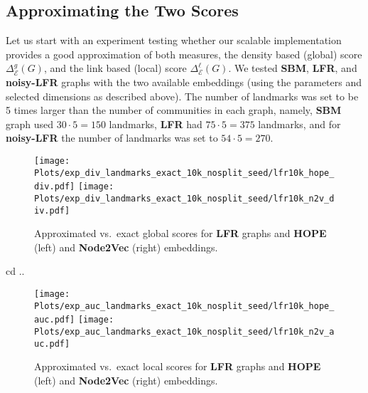 \documentclass[11pt]{article}
\newcommand{\emb}{\mathcal E}
\begin{document}
\subsection{Approximating the Two Scores}\label{sec:landmarks}

Let us start with an experiment testing whether our scalable implementation provides a good approximation of both measures, the 
density based (global) score $\Delta_\emb^g(G)$, and the link based (local) score $\Delta_\emb^{\ell}(G)$. We tested \textbf{SBM}, \textbf{LFR}, and \textbf{noisy-LFR} graphs with the two available embeddings (using the parameters and selected dimensions as described above). The number of landmarks was set to be 5 times larger than the number of communities in each graph, namely, \textbf{SBM} graph used $30\cdot 5 = 150$ landmarks, \textbf{LFR} had $75\cdot 5 = 375$ landmarks, and for \textbf{noisy-LFR} the number of landmarks was set to $54\cdot 5 = 270$. 

 \begin{figure}[htb]
     \centering
     \texttt{[image: Plots/exp\_div\_landmarks\_exact\_10k\_nosplit\_seed/lfr10k\_hope\_div.pdf]}
         \hspace{.1cm}
     \texttt{[image: Plots/exp\_div\_landmarks\_exact\_10k\_nosplit\_seed/lfr10k\_n2v\_div.pdf]}
     \caption{Approximated vs.\ exact global scores for \textbf{LFR} graphs and \textbf{HOPE} (left) and \textbf{Node2Vec} (right) embeddings.}
     \label{fig_paper:10kapprox_exact_div}
 \end{figure}cd ..

 \begin{figure}[htb]
     \centering
     \texttt{[image: Plots/exp\_auc\_landmarks\_exact\_10k\_nosplit\_seed/lfr10k\_hope\_auc.pdf]}
         \hspace{.1cm}
     \texttt{[image: Plots/exp\_auc\_landmarks\_exact\_10k\_nosplit\_seed/lfr10k\_n2v\_auc.pdf]}
     \caption{Approximated vs.\ exact local scores for \textbf{LFR} graphs and \textbf{HOPE} (left) and \textbf{Node2Vec} (right) embeddings.}
     \label{fig_paper:10kapprox_exact_auc}
 \end{figure}
\end{document}
